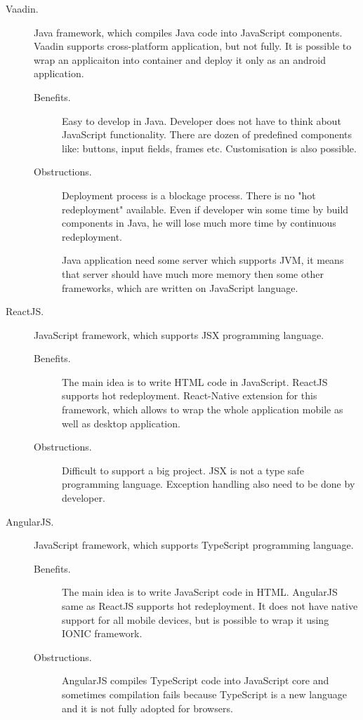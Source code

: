 \begin{description}
\item[Vaadin.] Java framework, which compiles Java code into JavaScript components. Vaadin supports cross-platform application, but not fully. It is possible to wrap an applicaiton into container and deploy it only as an android application.

\begin{description}
\item[Benefits.] Easy to develop in Java. Developer does not have to think about JavaScript functionality. There are dozen of predefined components like: buttons, input fields, frames etc. Customisation is also possible. 
\item[Obstructions.] Deployment process is a blockage process. There is no "hot redeployment" available. Even if developer win some time by build components in Java, he will lose much more time by continuous redeployment. 

Java application need some server which supports JVM, it means that server should have much more memory then some other frameworks, which are written on JavaScript language.  
\end{description}

\item[ReactJS.]  JavaScript framework, which supports JSX programming language. 
\begin{description} 
\item[Benefits.] The main idea is to write HTML code in JavaScript. ReactJS supports hot redeployment.  React-Native extension for this framework, which allows to wrap the whole application mobile as well as desktop application.
\item[Obstructions.]  Difficult to support a big project. JSX is not a type safe programming language. Exception handling also need to be done by developer.  
\end{description}
\item[AngularJS.] JavaScript framework, which supports TypeScript programming language.
\begin{description} 
\item[Benefits.] The main idea is to write JavaScript code in HTML.  AngularJS same as ReactJS supports hot redeployment.  It does not have native support for all mobile devices, but is possible to wrap it using IONIC framework. 
\item[Obstructions.]  AngularJS compiles TypeScript code into JavaScript core and sometimes compilation fails because TypeScript is a new language and it is not fully adopted for browsers. 
\end{description}
\end{description}
 
